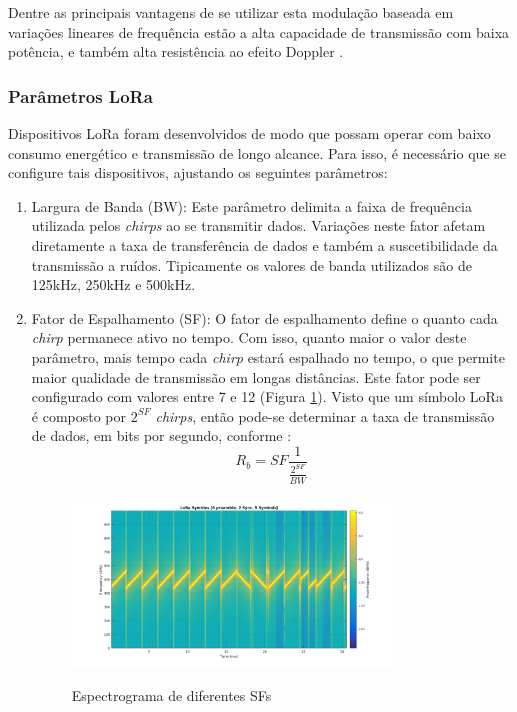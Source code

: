 \documentclass[oneside,openright,12pt]{ufsm_2015} %
\begin{document}
Dentre as principais vantagens de se utilizar esta modulação baseada em variações lineares de frequência estão a alta capacidade de transmissão com baixa potência, e também alta resistência ao efeito Doppler \cite{augustin2016study}.

\subsubsection{Parâmetros LoRa}
Dispositivos LoRa foram desenvolvidos de modo que possam operar com baixo consumo energético e transmissão de longo alcance. Para isso, é necessário que se configure tais dispositivos, ajustando os seguintes parâmetros:

\begin{enumerate}
    \item Largura de Banda (BW): Este parâmetro delimita a faixa de frequência utilizada pelos \textit{chirps} ao se transmitir dados. Variações neste fator afetam diretamente a taxa de transferência de dados e também a suscetibilidade da transmissão a ruídos. Tipicamente os valores de banda utilizados são de 125kHz, 250kHz e 500kHz.
    
    \item Fator de Espalhamento (SF): O fator de espalhamento define o quanto cada \textit{chirp} permanece ativo no tempo. Com isso, quanto maior o valor deste parâmetro, mais tempo cada \textit{chirp} estará espalhado no tempo, o que permite maior qualidade de transmissão em longas distâncias. Este fator pode ser configurado com valores entre 7 e 12 (Figura \ref{fig:lora-sf}). Visto que um símbolo LoRa é composto por $2^{SF}$ \textit{chirps}, então pode-se determinar a taxa de transmissão de dados, em bits por segundo, conforme \cite{lora-modulation-basics}:
    \begin{equation}
        R_b = SF\frac{1}{\frac{2^{SF}}{BW}}
    \end{equation}
    
    \begin{figure}[ht]
    \caption{\label{exepretex} Espectrograma de diferentes SFs}
    \centering
    \includegraphics[width=0.8\textwidth]{figuras/LoRa_Symbols_01.png}
    \vspace{\baselineskip} %
        \label{fig:lora-sf}
    

\end{figure}
\end{enumerate}
\end{document}
